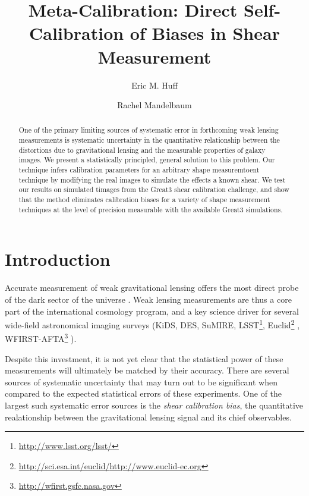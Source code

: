 \documentclass[iop]{emulateapj}
\begin{document}
\title{Meta-Calibration: Direct Self-Calibration of Biases in Shear Measurement}
\author{Eric M. Huff}
\author{Rachel Mandelbaum}



\begin{abstract}
  One of the primary limiting sources of systematic error in forthcoming
  weak lensing measurements is systematic uncertainty in the
  quantitative relationship between the distortions due to
  gravitational lensing and the measurable properties of galaxy
  images. We present a statistically principled, general solution to
  this problem. Our technique infers calibration parameters for an
  arbitrary shape measuremtoent technique by modifying the real images
  to simulate the effects a known shear. We test our results on
  simulated timages from the Great3 shear calibration challenge, and
  show that the method eliminates calibration biases for a variety of
  shape measurement techniques at the level of precision measurable
  with the available Great3 simulations.
\end{abstract}



\section{Introduction}


Accurate measurement of weak gravitational lensing offers the most
direct probe of the dark sector of the universe
\citep[e.g.,][]{2001PhR...340..291B,2003ARA&A..41..645R,schneider06,2008ARNPS..58...99H,2010RPPh...73h6901M,2013PhR...530...87W}.
Weak lensing measurements are thus a core part of the international
cosmology program, and a key science driver for several wide-field
astronomical imaging surveys (KiDS, DES, SuMIRE,
LSST\footnote{\url{http://www.lsst.org/lsst/}},
Euclid\footnote{\url{http://sci.esa.int/euclid/}\url{http://www.euclid-ec.org}}
\citep{2011arXiv1110.3193L},
WFIRST-AFTA\footnote{\url{http://wfirst.gsfc.nasa.gov}}
\citep{2009arXiv0912.0201L,2011arXiv1110.3193L,2015arXiv150303757S}).

Despite this investment, it is not yet clear that the statistical
power of these measurements will ultimately be matched by their
accuracy. There are several sources of systematic uncertainty that may
turn out to be significant when compared to the expected statistical
errors of these experiments. One of the largest such systematic error
sources is the {\it shear calibration bias}, the quantitative
realationship between the gravitational lensing signal and its chief
observables.
\end{document}
